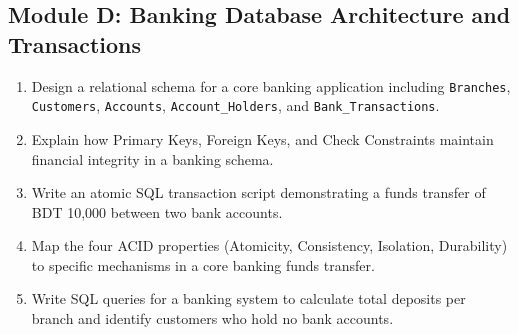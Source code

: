\subsection{Module D: Banking Database Architecture and Transactions}
\begin{enumerate}[resume]
    \item Design a relational schema for a core banking application including \texttt{Branches}, \texttt{Customers}, \texttt{Accounts}, \texttt{Account\_Holders}, and \texttt{Bank\_Transactions}.
    \item Explain how Primary Keys, Foreign Keys, and Check Constraints maintain financial integrity in a banking schema.
    \item Write an atomic SQL transaction script demonstrating a funds transfer of BDT 10,000 between two bank accounts.
    \item Map the four ACID properties (Atomicity, Consistency, Isolation, Durability) to specific mechanisms in a core banking funds transfer.
    \item Write SQL queries for a banking system to calculate total deposits per branch and identify customers who hold no bank accounts.
\end{enumerate}

